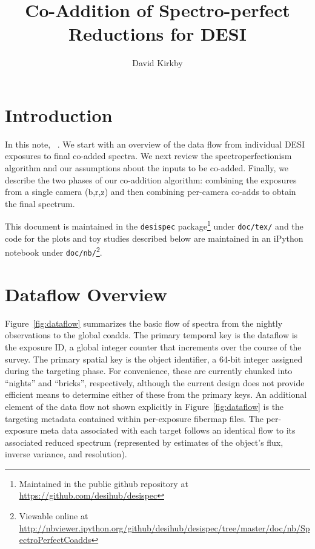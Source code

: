 \documentclass[12pt]{article}
\title{Co-Addition of Spectro-perfect\\
Reductions for DESI\\
\vspace{5mm}{\large\bf DESI-doc-????}}
\author{David Kirkby}
\providecommand{\fig}[1]{Figure~\ref{fig:#1}}
\begin{document}
\maketitle

\section{Introduction}

In this note, ~\cite{2010PASP..122..248B}. We start with an overview of the data flow from individual DESI exposures to final co-added spectra. We next review the spectroperfectionism algorithm and our assumptions about the inputs to be co-added. Finally, we describe the two phases of our co-addition algorithm: combining the exposures from a single camera (b,r,z) and then combining per-camera co-adds to obtain the final spectrum.

This document is maintained in the {\tt desispec} package\footnote{Maintained in the public github repository at \url{https://github.com/desihub/desispec}} under {\tt doc/tex/} and the code for the plots and toy studies described below are maintained in an iPython notebook under {\tt doc/nb/}\footnote{Viewable online at \url{http://nbviewer.ipython.org/github/desihub/desispec/tree/master/doc/nb/SpectroPerfectCoadds}}.

\section{Dataflow Overview}

\fig{dataflow} summarizes the basic flow of spectra from the nightly observations to the global coadds. The primary temporal key is the dataflow is the exposure ID, a global integer counter that increments over the course of the survey. The primary spatial key is the object identifier, a 64-bit integer assigned during the targeting phase. For convenience, these are currently chunked into ``nights'' and ``bricks'', respectively, although the current design does not provide efficient means to determine either of these from the primary keys. An additional element of the data flow not shown explicitly in \fig{dataflow} is the targeting metadata contained within per-exposure fibermap files. The per-exposure meta data associated with each target follows an identical flow to its associated reduced spectrum (represented by estimates of the object's flux, inverse variance, and resolution).
\end{document}
